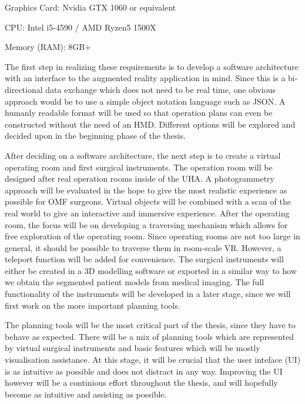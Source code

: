\begin{compactenum}[label=(\alph*)]
    \item Graphics Card: Nvidia GTX 1060 or equivalent
    \item CPU: Intel i5-4590 / AMD Ryzen5 1500X
    \item Memory (RAM): 8GB+
\end{compactenum}

The first step in realizing these requirements is to develop a software architecture with an interface to the augmented reality application in mind.
Since this is a bi-directional data exchange which does not need to be real time, one obvious approach would be to use a simple object notation language such as JSON.
A humanly readable format will be used so that operation plans can even be constructed without the need of an HMD.
Different options will be explored and decided upon in the beginning phase of the thesis.

After deciding on a software architecture, the next step is to create a virtual operating room and first surgical instruments.
The operation room will be designed after real operation rooms inside of the UHA.
A photogrammetry approach will be evaluated in the hope to give the most realistic experience as possible for OMF surgeons.
Virtual objects will be combined with a scan of the real world to give an interactive and immersive experience.
After the operating room, the focus will be on developing a traversing mechanism which allows for free exploration of the operating room.
Since operating rooms are not too large in general, it should be possible to traverse them in room-scale VR.
However, a teleport function will be added for convenience.
The surgical instruments will either be created in a 3D modelling software or exported in a similar way to how we obtain the segmented patient models from medical imaging.
The full functionality of the instruments will be developed in a later stage, since we will first work on the more important planning tools.

The planning tools will be the most critical part of the thesis, since they have to behave as expected.
There will be a mix of planning tools which are represented by virtual surgical instruments and basic features which will be mostly visualisation assistance.
At this stage, it will be crucial that the user inteface (UI) is as intuitive as possible and does not distract in any way.
Improving the UI however will be a continious effort throughout the thesis, and will hopefully become as intuitive and assisting as possible.

